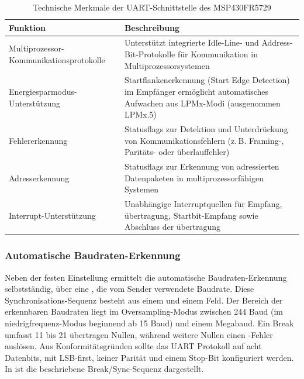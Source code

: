 \newpage
\begin{table}[h!]
	\small
	\centering
	\begin{tabular}{|p{6.5cm}|p{7cm}|}
		\hline
		\textbf{Funktion} & \textbf{Beschreibung} \\
		\hline
		Multiprozessor-Kommunikationsprotokolle & Unterst\"utzt integrierte Idle-Line- und Address-Bit-Protokolle f\"ur Kommunikation in Multiprozessorsystemen \\
		\hline
		Energiesparmodus-Unterst\"utzung & Startflankenerkennung (Start Edge Detection) im Empf\"anger erm\"oglicht automatisches Aufwachen aus LPMx-Modi (ausgenommen LPMx.5) \\
		\hline
		Fehlererkennung & Statusflags zur Detektion und Unterdr\"uckung von Kommunikationsfehlern (z.\,B. Framing-, Parit\"ats- oder \"uberlauffehler) \\
		\hline
		Adresserkennung & Statusflags zur Erkennung von adressierten Datenpaketen in multiprozessorf\"ahigen Systemen \\
		\hline
		Interrupt-Unterst\"utzung & Unabh\"angige Interruptquellen f\"ur Empfang, \"ubertragung, Startbit-Empfang sowie Abschluss der \"ubertragung \\
		\hline
	\end{tabular}
	\caption{Technische Merkmale der UART-Schnittstelle des MSP430FR5729\\}
	\label{tab:uart_features}
\end{table}

\subsubsection{Automatische Baudraten-Erkennung}
\label{sec:auto_baud}

Neben der festen Einstellung ermittelt die automatische Baudraten-Erkennung selbstst\"andig, \"uber eine , die vom Sender verwendete Baudrate. Diese Synchronisations-Sequenz besteht aus einem  und einem  Feld. Der Bereich der erkennbaren Baudraten liegt im Oversampling-Modus zwischen 244 Baud (im niedrigfrequenz-Modus beginnend ab 15 Baud) und einem Megabaud. Ein Break umfasst 11 bis 21 \"ubertragen Nullen, w\"ahrend weitere Nullen einen -Fehler ausl\"osen. Aus Konformit\"atsgr\"unden sollte das UART Protokoll auf acht Datenbits, mit LSB-first, keiner Parit\"at und einem Stop-Bit konfiguriert werden. In  ist die beschriebene Break/Sync-Sequenz dargestellt.

